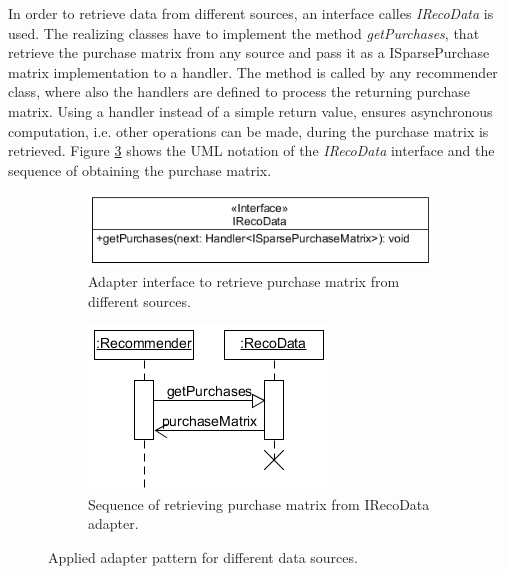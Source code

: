 \documentclass[10pt]{reportMaster}
\begin{document}
In order to retrieve data from different sources, an interface calles \textit{IRecoData} is used.
The realizing classes have to implement the method \textit{getPurchases}, that retrieve the purchase matrix from any source and pass it as a ISparsePurchase matrix implementation to a handler.
The method is called by any recommender class, where also the handlers are defined to process the returning purchase matrix.
Using a handler instead of a simple return value, ensures asynchronous computation, i.e. other operations can be made, during the purchase matrix is retrieved.
Figure \ref{fig:getPurchases} shows the UML notation of the \textit{IRecoData} interface and the sequence of obtaining the purchase matrix.


\begin{figure}
	\centering
	\begin{subfigure}[t]{0.6\textwidth}
		\includegraphics[width=\textwidth]{figures/implementation/IRecoDataInterface}
		\caption{Adapter interface to retrieve purchase matrix from different sources.}
		\label{fig:irecodataInterface}
	\end{subfigure}
	\begin{subfigure}[t]{0.35\textwidth}
		\includegraphics[width=\textwidth]{figures/implementation/getPurchasesSequence}
		\caption{Sequence of retrieving purchase matrix from IRecoData adapter.}
		\label{fig:getPurchasesSequence}
	\end{subfigure}
	\caption{Applied adapter pattern for different data sources.}
	\label{fig:getPurchases}
\end{figure}
\end{document}
